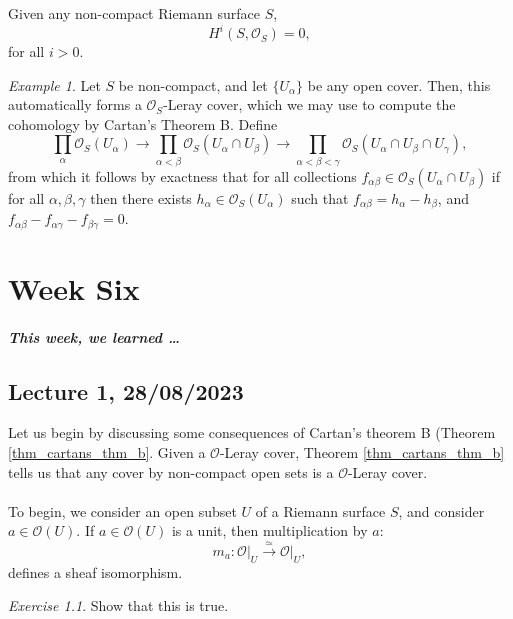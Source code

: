 \documentclass[a4paper]{report}
\theoremstyle{definition}
\theoremstyle{remark}
\theoremstyle{proposition}
\theoremstyle{conjecture}
\theoremstyle{lemma}
\theoremstyle{corollary}
\theoremstyle{exercise}
\newtheorem{exercise}{Exercise}
\theoremstyle{example}
\newtheorem{example}{Example}
\newcommand{\mcal}{\mathcal}
\begin{document}
\begin{theorem}\label{thm_cartans_thm_b}
    Given any non-compact Riemann surface $S$, 
    $$H^i(S,\mcal{O}_S) = 0,$$
    for all $i > 0$.
\end{theorem}

\begin{example}
    Let $S$ be non-compact, and let $\lbrace U_\alpha\rbrace$ be any open cover.
    Then, this automatically forms a $\mcal{O}_S$-Leray cover, which we 
    may use to compute the cohomology by Cartan's Theorem B.
    Define 
    $$\prod_\alpha \mcal{O}_S(U_\alpha) \longrightarrow \prod_{\alpha < \beta} \mcal{O}_S(U_\alpha \cap U_\beta) \longrightarrow \prod_{\alpha < \beta <\gamma} \mcal{O}_S(U_\alpha \cap U_\beta \cap U_\gamma),$$
    from which it follows by exactness that for all collections 
    $f_{\alpha\beta} \in \mcal{O}_S(U_\alpha\cap U_\beta)$ if for all
    $\alpha,\beta,\gamma$ then there exists $h_\alpha \in \mcal{O}_S(U_\alpha)$
    such that $f_{\alpha\beta} = h_\alpha - h_\beta$, and 
    $f_{\alpha\beta} - f_{\alpha\gamma} - f_{\beta\gamma} = 0$.
\end{example}

\chapter{Week Six}

\paragraph{This week, we learned \ldots}

\section{Lecture 1, 28/08/2023}

Let us begin by discussing some consequences of Cartan's theorem B (Theorem 
\ref{thm_cartans_thm_b}. Given a $\mcal{O}$-Leray cover, Theorem 
\ref{thm_cartans_thm_b} tells us that any cover by non-compact open sets 
is a $\mcal{O}$-Leray cover.\\\\
To begin, we consider an open subset $U$ of a Riemann surface $S$, and 
consider $a \in \mcal{O}(U)$. If $a \in \mcal{O}(U)$ is a unit, then
multiplication by $a$:
$$m_a : \mcal{O}\vert_U \stackrel{\simeq}{\longrightarrow} \mcal{O}\vert_U,$$
defines a sheaf isomorphism.
\begin{exercise}
    Show that this is true.
\end{exercise}
\end{document}
